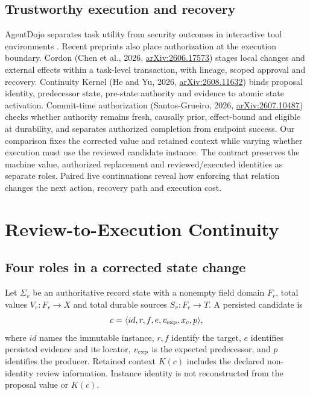 \documentclass[10pt,a4paper,twocolumn]{article}
\begin{document}
\subsection{Trustworthy execution and \mbox{recovery}}
AgentDojo separates task utility from security outcomes in interactive tool environments \citep{debenedetti2024agentdojo}. Recent preprints also place authorization at the execution boundary. Cordon (Chen et al., 2026, \href{https://arxiv.org/abs/2606.17573}{arXiv:2606.17573}) stages local changes and external effects within a task-level transaction, with lineage, scoped approval and recovery. Continuity Kernel (He and Yu, 2026, \href{https://arxiv.org/abs/2608.11632}{arXiv:2608.11632}) binds proposal identity, predecessor state, pre-state authority and evidence to atomic state activation. Commit-time authorization (Santos-Grueiro, 2026, \href{https://arxiv.org/abs/2607.10487}{arXiv:2607.10487}) checks whether authority remains fresh, causally prior, effect-bound and eligible at durability, and separates authorized completion from endpoint success. Our comparison fixes the corrected value and retained context while varying whether execution must use the reviewed candidate instance. The contract preserves the machine value, authorized replacement and reviewed/executed identities as separate roles. Paired live continuations reveal how enforcing that relation changes the next action, recovery path and execution cost.

\section{Review-to-Execution \mbox{Continuity}}
\subsection{Four roles in a corrected state change}
Let $\Sigma_v$ be an authoritative record state with a nonempty field domain $F_r$, total values $V_v:F_r\to X$ and total durable sources $S_v:F_r\to T$. A persisted candidate is
\begin{equation}
c=\langle id,r,f,e,v_{\rm exp},x_c,p\rangle,
\end{equation}
where $id$ names the immutable instance, $r,f$ identify the target, $e$ identifies persisted evidence and its locator, $v_{\rm exp}$ is the expected predecessor, and $p$ identifies the producer. Retained context $K(c)$ includes the declared non-identity review information. Instance identity is not reconstructed from the proposal value or $K(c)$.
\end{document}
